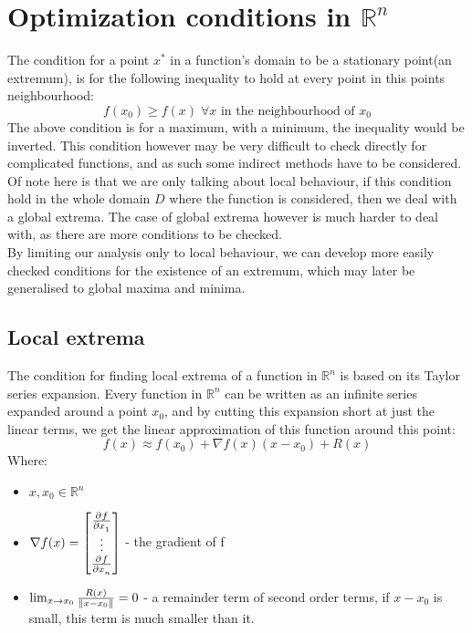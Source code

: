 \chapter{Optimization conditions in $\mathbb{R}^{n}$}
The condition for a point $x^{*}$ in a function's domain to be a stationary point(an extremum), is for the following inequality
to hold at every point in this points neighbourhood:
\begin{equation}
    f(x_0) \ge f(x) \; \forall x \text{ in the neighbourhood of $x_0$}
    \label{ext}
\end{equation}
The above condition is for a maximum, with a minimum, the inequality would be inverted. This condition however
may be very difficult to check directly for complicated functions, and as such some indirect methods have to be considered.
Of note here is that we are only talking about local behaviour, if this condition hold in the whole domain $D$ where the 
function is considered, then we deal with a global extrema. The case of global extrema however is much harder to deal with,
as there are more conditions to be checked. \\
By limiting our analysis only to local behaviour, we can develop more easily checked conditions for the existence of an extremum,
which may later be generalised to global maxima and minima.

\section{Local extrema}


The condition for finding local extrema of a function in $\mathbb{R}^{n}$ is based on its Taylor series expansion.
Every function in $\mathbb{R}^{n}$ can be written as an infinite series expanded around a point $x_0$, and by cutting 
this expansion short at just the linear terms, we get the linear approximation of this function around this point:
\begin{equation}
    f(x) \approx f(x_0) + \nabla f(x)(x-x_0) + R(x)
\end{equation}
Where:
\begin{itemize}
        \item $x,x_0 \in  \mathbb{R}^{n}$ 
        \item $\nabla f(x) = \begin{bmatrix}
                \pdv{f}{x_1}\\ \vdots \\ \pdv{f}{x_n}

        \end{bmatrix}$ - the gradient of f
    \item $\lim_{x \rightarrow x_0}\frac{R(x)}{\norm{x-x_0}} = 0$ - a remainder term of second order terms, if $x - x_0$ is small, this term is much smaller than it.
\end{itemize}


